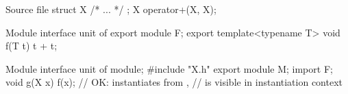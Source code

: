 \pnum
\begin{example}
\begin{codeblocktu}{Source file }
struct X { /* ... */ };
X operator+(X, X);
\end{codeblocktu}

\begin{codeblocktu}{Module interface unit of }
export module F;
export template<typename T>
void f(T t) {
  t + t;
}
\end{codeblocktu}

\begin{codeblocktu}{Module interface unit of }
module;
#include "X.h"
export module M;
import F;
void g(X x) {
  f(x);             // OK: instantiates  from ,
                    //  is visible in instantiation context
}
\end{codeblocktu}
\end{example}

